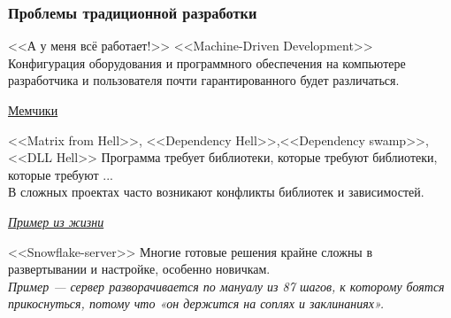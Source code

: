 \documentclass[9pt, aspectratio=1610]{beamer}
\begin{document}
\begin{frame}\frametitle{Проблемы традиционной разработки}
	
	\begin{alertblock}{<<А у меня всё работает!>> 
			<<Machine-Driven Development>>}
		Конфигурация оборудования и программного обеспечения на компьютере разработчика и пользователя почти гарантированного будет различаться. 
		
		\hyperlink{f:iwomm}{\color{cyan}Мемчики}\label{ref:tomemes}
	\end{alertblock}
	
	\pause
	
	\begin{alertblock}{<<Matrix from Hell>>, <<Dependency Hell>>,<<Dependency swamp>>, <<DLL Hell>>}
		Программа требует библиотеки, которые требуют библиотеки, которые требуют ... \\
		В сложных проектах часто возникают конфликты библиотек и зависимостей.  
		
		\hyperlink{f:electro}{\color{cyan}\itshape Пример из жизни}\label<2>{ref:toelectro}
	\end{alertblock}
	
	\pause
	
	\begin{alertblock} {<<Snowflake-server>>}
		Многие готовые решения крайне сложны в развертывании и настройке, особенно новичкам. \\
		\itshape Пример --- сервер разворачивается по мануалу из 87 шагов, к которому боятся прикоснуться, потому что «он держится на соплях и заклинаниях».
	\end{alertblock}
	
	
\end{frame}
\end{document}
